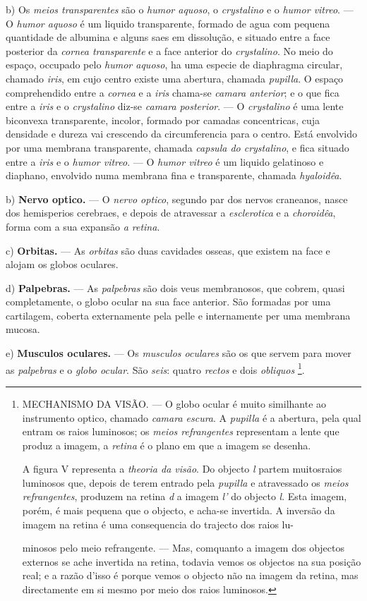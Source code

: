 b) Os \emph{meios transparentes} são o \emph{humor aquoso}, o \emph{crystalino} e o \emph{humor vitreo}. --- O \emph{humor aquoso} é um liquido transparente, formado de agua com pequena quantidade de albumina e alguns saes em dissolução, e situado entre a face posterior da \emph{cornea transparente} e a face anterior do \emph{crystalino}. No meio do espaço, occupado pelo \emph{humor aquoso}, ha uma especie de diaphragma circular, chamado \emph{iris}, em cujo centro existe uma abertura, chamada \emph{pupilla}. O espaço comprehendido entre a \emph{cornea} e a \emph{iris} chama-se \emph{camara anterior}; e o que fica entre a \emph{iris} e o \emph{crystalino} diz-se \emph{camara posterior}. --- O \emph{crystalino} é uma lente biconvexa transparente, incolor, formado por camadas concentricas, cuja densidade e dureza vai crescendo da circumferencia para o centro. Está envolvido por uma membrana transparente, chamada \emph{capsula do crystalino}, e fica situado entre a \emph{iris} e o \emph{humor vitreo}. --- O \emph{humor vitreo} é um liquido gelatinoso e diaphano, envolvido numa membrana fina e transparente, chamada \emph{hyaloidêa}.

b) \textbf{Nervo optico.} --- O \emph{nervo optico}, segundo par dos nervos craneanos, nasce dos hemisperios cerebraes, e depois de atravessar a \emph{esclerotica} e a \emph{choroidêa}, forma com a sua expansão \emph{a retina}.

c) \textbf{Orbitas.} --- As \emph{orbitas} são duas cavidades osseas, que existem na face e alojam os globos oculares.

d) \textbf{Palpebras.} --- As \emph{palpebras} são dois veus membranosos, que cobrem, quasi completamente, o globo ocular na sua face anterior. São formadas por uma cartilagem, coberta externamente pela pelle e internamente per uma membrana mucosa.

e) \textbf{Musculos oculares.} --- Os \emph{musculos oculares} são os que servem para mover as \emph{palpebras} e o \emph{globo ocular}. São \emph{seis}: quatro \emph{rectos} e dois \emph{obliquos} \footnote{\textsc{MECHANISMO} DA VISÃO. --- O globo ocular é muito similhante ao instrumento optico, chamado \emph{camara escura}. A \emph{pupilla} é a abertura, pela qual entram os raios luminosos; os \emph{meios refrangentes} representam a lente que produz a imagem, a \emph{retina} é o plano em que a imagem se desenha.\par A figura V representa a \emph{theoria da visão}. Do objecto \emph{l} partem muitosraios luminosos que, depois de terem entrado pela \emph{pupilla} e atravessado os \emph{meios refrangentes}, produzem na retina \emph{d} a imagem \emph{l'} do objecto \emph{l}. Esta imagem, porém, é mais pequena que o objecto, e acha-se invertida. A inversão da imagem na retina é uma consequencia do trajecto dos raios lu-\par minosos pelo meio refrangente. --- Mas, comquanto a imagem dos objectos externos se ache invertida na retina, todavia vemos os objectos na sua posição real; e a razão d'isso é porque vemos o objecto não na imagem da retina, mas directamente em si mesmo por meio dos raios luminosos.}.

